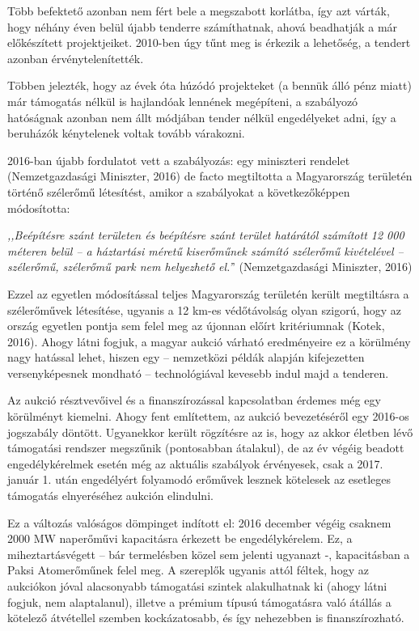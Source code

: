 \documentclass[twoside, magyar, showtrims]{corvinusphd}
\theoremstyle{plain}
\theoremstyle{remark}
\theoremstyle{definition}
\begin{document}
Több befektető azonban nem fért bele
a megszabott korlátba, így azt várták,
hogy néhány éven belül újabb tenderre
számíthatnak, ahová beadhatják a már előkészített projektjeiket.
2010-ben úgy tűnt meg is érkezik a lehetőség,
a tendert azonban érvénytelenítették.

Többen jelezték, hogy az évek óta húzódó
projekteket (a bennük álló pénz miatt) már támogatás
nélkül is hajlandóak lennének megépíteni, a szabályozó hatóságnak
azonban nem állt módjában tender nélkül
engedélyeket adni, így a beruházók
kénytelenek voltak tovább várakozni.

2016-ban újabb fordulatot vett a szabályozás:
egy miniszteri rendelet (Nemzetgazdasági Miniszter, 2016)
de facto megtiltotta a Magyarország területén történő szélerőmű létesítést,
amikor a szabályokat a következőképpen módosította:

\textit{,,Beépítésre szánt területen
és beépítésre szánt terület határától számított 12 000 méteren belül –
a háztartási méretű kiserőműnek számító szélerőmű kivételével –
szélerőmű, szélerőmű park nem helyezhető el.'}' (Nemzetgazdasági Miniszter, 2016)

Ezzel az egyetlen módosítással teljes Magyarország területén került
megtiltásra a szélerőművek létesítése, ugyanis a 12 km-es 
védőtávolság olyan szigorú, hogy az ország egyetlen pontja sem felel
meg az újonnan előírt kritériumnak (Kotek, 2016).
Ahogy látni fogjuk, a magyar aukció várható eredményeire
ez a körülmény nagy hatással lehet, hiszen egy -- nemzetközi
példák alapján kifejezetten versenyképesnek mondható -- technológiával
kevesebb indul majd a tenderen.

Az aukció résztvevőivel és a finanszírozással kapcsolatban érdemes még egy
körülményt kiemelni. Ahogy fent említettem, az aukció bevezetéséről egy
2016-os jogszabály döntött. Ugyanekkor került
rögzítésre az is, hogy az akkor életben lévő támogatási rendszer
megszűnik (pontosabban átalakul), de az év végéig beadott engedélykérelmek
esetén még az aktuális szabályok érvényesek, csak a 2017. január 1. után
engedélyért folyamodó erőművek lesznek kötelesek az esetleges
támogatás elnyeréséhez aukción elindulni.

Ez a változás valóságos dömpinget indított el: 2016 december végéig
csaknem 2000 MW naperőművi kapacitásra érkezett be
engedélykérelem. Ez, a miheztartásvégett -- bár termelésben közel
sem jelenti ugyanazt -, kapacitásban a Paksi Atomerőműnek felel meg.
A szereplők ugyanis attól féltek, hogy az aukciókon
jóval alacsonyabb támogatási szintek alakulhatnak ki
(ahogy látni fogjuk, nem alaptalanul),
illetve a prémium típusú támogatásra való átállás a kötelező átvétellel
szemben kockázatosabb, és így nehezebben is finanszírozható.
\end{document}
